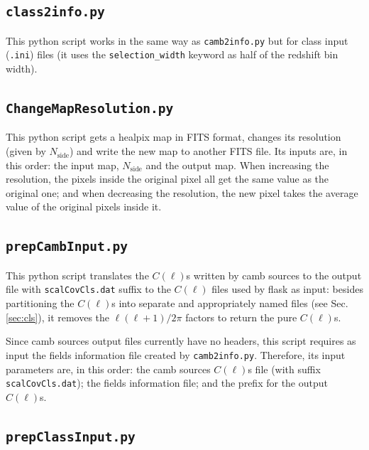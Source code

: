\documentclass[12pt]{book} %
\newcommand{\nv}[1]{\mathrm{#1}}                 %
\begin{document}
\subsection{{\tt class2info.py}}
\label{sec:class2info}

This {\sc python} script works in the same way as {\tt camb2info.py} but 
for {\sc class} input ({\tt .ini}) files (it uses the {\tt selection\_width} 
keyword as half of the redshift bin width).

\subsection{{\tt ChangeMapResolution.py}}
\label{sec:map-res}

This {\sc python} script gets a {\sc healpix} map in FITS format, changes its 
resolution (given by $N_{\nv{side}}$) and write the new map 
to another FITS file. Its inputs are, in this order: the input map, $N_{\nv{side}}$ 
and the output map. When increasing the resolution, the pixels inside the original 
pixel all get the same value as the original one; and when decreasing the resolution, the new pixel takes 
the average value of the original pixels inside it. 

\subsection{{\tt prepCambInput.py}}
\label{sec:prepcambinput}

This {\sc python} script translates the $C(\ell)$s written by {\sc camb sources} to the 
output file with {\tt scalCovCls.dat} suffix to the $C(\ell)$ files used by {\sc flask} 
as input: besides partitioning the $C(\ell)$s into separate and appropriately named files  
(see Sec. \ref{sec:cls}), it removes the $\ell(\ell+1)/2\pi$ factors to return the pure 
$C(\ell)$s. 

Since {\sc camb sources} output files currently have no headers, this script requires 
as input the fields information file created by {\tt camb2info.py}. Therefore, its input 
parameters are, in this order: the {\sc camb sources} $C(\ell)$s file (with suffix {\tt scalCovCls.dat}); 
the fields information file; and the prefix for the output $C(\ell)$s.

\subsection{{\tt prepClassInput.py}}
\label{sec:prepclassinput}
\end{document}
